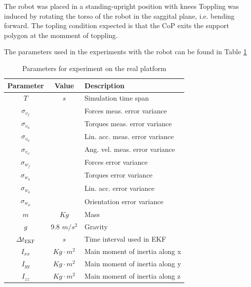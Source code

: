 \documentclass[letterpaper, 10 pt, conference]{ieeeconf}  %
\begin{document}
The robot was placed in a standing-upright position with knees Toppling was induced by rotating the torso of the robot in the saggital plane, i.e. bending forward. The topling condition expected is that the CoP exits the support polygon at the momment of toppling.

The parameters used in the experiments with the robot can be found in Table \ref{table:paramsPlatform}

\begin{table}[h]
\caption{Parameters for experiment on the real platform }
\centering
\begin{tabular}{ccl}
\hline \hline
Parameter                   & Value        & Description \\ \hline \hline
$T$                         &  $s$      & Simulation time span\\
$\sigma_{v_f}$              &         & Forces meas. error variance\\
$\sigma_{v_u}$              &         & Torques meas. error variance \\
$\sigma_{v_a}$              &          & Lin. acc. meas. error variance\\
$\sigma_{v_{\omega}}$       &          & Ang. vel. meas. error variance\\
$\sigma_{w_f}$              &          & Forces error variance\\
$\sigma_{w_u}$              &          & Torques error variance\\
$\sigma_{w_a}$              &         & Lin. acc. error variance\\
$\sigma_{w_{\phi}}$         &         & Orientation error variance \\ 
$m$                         &  $Kg$       & Mass \\ 
$g$                         & 9.8 $m/s^2$  & Gravity\\ 
$\Delta t_{\textrm{EKF}}$   &  $s$     & Time interval used in EKF\\
$I_{xx}$                    &  $Kg \cdot m^2$& Main moment of inertia along x \\ 
$I_{yy}$                    &  $Kg \cdot m^2$& Main moment of inertia along y \\
$I_{zz}$                    &  $Kg \cdot m^2$& Main moment of inertia along z \\
\hline
\end{tabular}
\label{table:paramsPlatform}
\end{table} 
\end{document}
